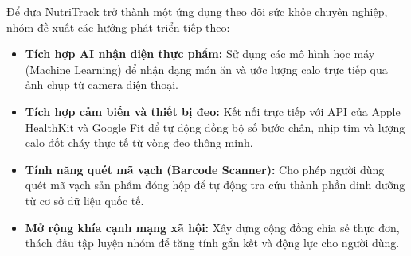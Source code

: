 \documentclass[12pt,a4paper]{article}
\begin{document}
Để đưa NutriTrack trở thành một ứng dụng theo dõi sức khỏe chuyên nghiệp, nhóm đề xuất các hướng phát triển tiếp theo:
\begin{itemize}
    \item \textbf{Tích hợp AI nhận diện thực phẩm:} Sử dụng các mô hình học máy (Machine Learning) để nhận dạng món ăn và ước lượng calo trực tiếp qua ảnh chụp từ camera điện thoại.
    \item \textbf{Tích hợp cảm biến và thiết bị đeo:} Kết nối trực tiếp với API của Apple HealthKit và Google Fit để tự động đồng bộ số bước chân, nhịp tim và lượng calo đốt cháy thực tế từ vòng đeo thông minh.
    \item \textbf{Tính năng quét mã vạch (Barcode Scanner):} Cho phép người dùng quét mã vạch sản phẩm đóng hộp để tự động tra cứu thành phần dinh dưỡng từ cơ sở dữ liệu quốc tế.
    \item \textbf{Mở rộng khía cạnh mạng xã hội:} Xây dựng cộng đồng chia sẻ thực đơn, thách đấu tập luyện nhóm để tăng tính gắn kết và động lực cho người dùng.
\end{itemize}
\end{document}

